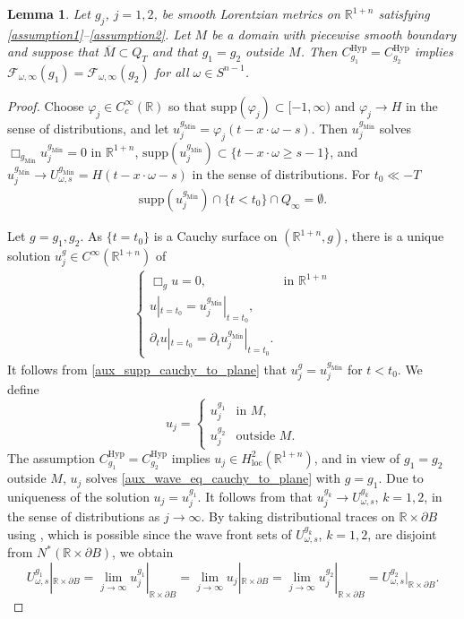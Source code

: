 \documentclass[11pt,letterpaper]{amsart}
\newtheorem{Lemma}[Theorem]{Lemma}
\theoremstyle{definition}
\numberwithin{equation}{section}
\newcommand{\mR}{\mathbb{R}}                    %
\newcommand{\supp}{\mathrm{supp}}
\newcommand{\p}{\partial}
\newcommand{\gm}{g_{\mathrm{Min}}}
\def\p{\partial}
\def\R{\mathbb R}
\begin{document}
\begin{Lemma}\label{lem_cauchy_to_plane}
Let $g_j$, $j=1,2$, be smooth Lorentzian metrics on $\R^{1+n}$ satisfying \eqref{assumption1}--\eqref{assumption2}. Let $M$ be a domain with piecewise smooth boundary and suppose that $\overline M \subset Q_T$ and that $g_1 = g_2$ outside $M$. Then $C_{g_1}^{\mathrm{Hyp}} = C_{g_2}^{\mathrm{Hyp}}$ implies $\mathcal F_{\omega, \infty}(g_1) = \mathcal F_{\omega, \infty}(g_2)$ for all $\omega \in S^{n-1}$.
\end{Lemma}
\begin{proof}
Choose $\varphi_j \in C^{\infty}_c(\mR)$ so that $\supp(\varphi_j) \subset [-1,\infty)$ and $\varphi_j \to H$ in the sense of distributions, and let $u_j^{\gm} = \varphi_j(t-x\cdot \omega - s)$. Then $u_j^{\gm}$ solves $\Box_{\gm} u_j^{\gm} = 0$ in $\mR^{1+n}$, $\supp(u_j^{\gm}) \subset \{ t - x \cdot \omega \geq s -1 \}$, and $u_j^{\gm} \to U_{\omega,s}^{\gm} = H(t - x \cdot \omega - s)$ in the sense of distributions. For $t_0 \ll -T$ 
    \begin{align}\label{aux_supp_cauchy_to_plane}
\supp(u_j^{\gm}) \cap \{t < t_0\} \cap Q_\infty = \emptyset.
    \end{align}

Let $g = g_1, g_2$.
As $\{t = t_0\}$ is a Cauchy surface on $(\R^{1+n}, g)$, there is a unique solution $u_j^g \in C^\infty(\R^{1+n})$ of 
    \begin{align}\label{aux_wave_eq_cauchy_to_plane}
\begin{cases}
\Box_g u = 0, & \text{in $\R^{1+n}$}
\\
u|_{t=t_0} = u_j^{\gm}|_{t=t_0},
\\
\p_t u|_{t=t_0} = \p_t u_j^{\gm}|_{t=t_0}.
\end{cases}
    \end{align}
It follows from \eqref{aux_supp_cauchy_to_plane} that $u_j^g = u_j^{\gm}$ for $t < t_0$.
We define 
\[
u_j = \left\{ \begin{array}{cl} u_j^{g_1} & \text{in $M$}, \\ u_j^{g_2} & \text{outside $M$}. \end{array} \right.
\]
The assumption $C_{g_1}^{\mathrm{Hyp}} = C_{g_2}^{\mathrm{Hyp}}$ implies
$u_j \in H^2_{\mathrm{loc}}(\mR^{1+n})$, and in view of $g_1 = g_2$ outside $M$, $u_j$ solves \eqref{aux_wave_eq_cauchy_to_plane} with $g=g_1$. Due to uniqueness of the solution $u_j = u_j^{g_1}$. 
It follows from \cite[Lemma 4.1]{bar2015} that 
$u_j^{g_k} \to U_{\omega,s}^{g_k}$, $k=1,2$, in the sense of distributions as $j \to \infty$.
By taking distributional traces on $\mR \times \p B$ using \cite[Theorem 8.2.4 and Corollary 8.2.7]{hormander}, which is possible since the wave front sets of $U_{\omega,s}^{g_k}$, $k=1,2$, are disjoint from $N^*(\mR \times \p B)$, we obtain 
\[
U_{\omega,s}^{g_1}|_{\mR \times \p B} 
= \lim_{j \to \infty} u_j^{g_1}|_{\mR \times \p B} 
= \lim_{j \to \infty} u_j|_{\mR \times \p B} 
= \lim_{j \to \infty} u_j^{g_2}|_{\mR \times \p B} 
= U_{\omega,s}^{g_2}|_{\mR \times \p B}.
\]
\end{proof}
\end{document}
